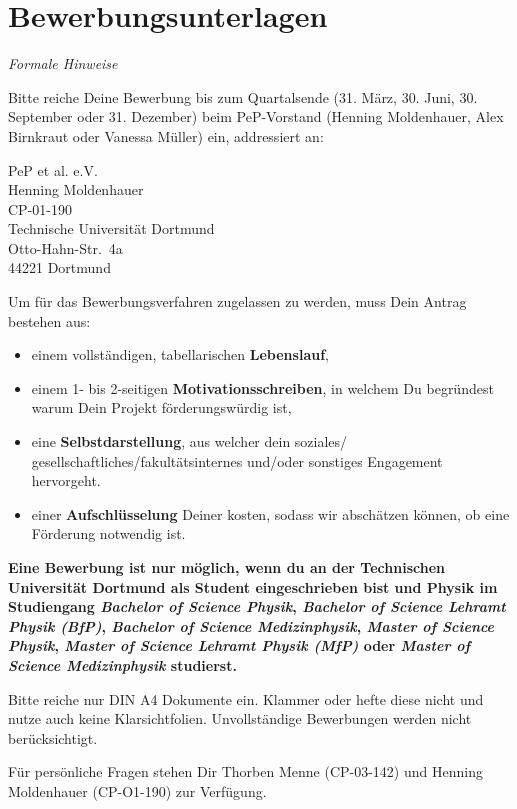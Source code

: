 \documentclass[
  paper=a4,
  fontsize=12pt,
  DIV=16,
  headheight=52pt,
  footheight=45pt,
  headinclude,
  parskip=full,
]{scrartcl}
\begin{document}
\section*{Bewerbungsunterlagen}
\emph{Formale Hinweise}

Bitte reiche Deine Bewerbung bis zum Quartalsende (31. März, 30. Juni,
30. September oder 31. Dezember) beim PeP-Vorstand
(Henning Moldenhauer, Alex Birnkraut oder Vanessa Müller) ein,
addressiert an:

PeP et al. e.V.\\
Henning Moldenhauer\\
CP-01-190\\[0.5\baselineskip]
Technische Universität Dortmund\\
Otto-Hahn-Str.~4a\\
44221 Dortmund

Um für das Bewerbungsverfahren zugelassen zu werden, muss Dein Antrag bestehen aus:
\begin{itemize}
  \item einem vollständigen, tabellarischen \textbf{Lebenslauf},
  \item einem 1- bis 2-seitigen \textbf{Motivationsschreiben}, in welchem Du
	  begründest warum Dein Projekt förderungswürdig ist,
  \item eine \textbf{Selbstdarstellung}, aus welcher dein soziales/
	  gesellschaftliches/fakultätsinternes und/oder sonstiges Engagement hervorgeht.
  \item einer \textbf{Aufschlüsselung} Deiner kosten, sodass wir abschätzen können,
	  ob eine Förderung notwendig ist.
\end{itemize}

\textbf{%
  Eine Bewerbung ist nur möglich, wenn du an der Technischen Universität Dortmund
  als Student eingeschrieben bist und Physik im Studiengang
  \emph{Bachelor of Science Physik},
  \emph{Bachelor of Science Lehramt Physik (BfP)},
  \emph{Bachelor of Science Medizinphysik},
  \emph{Master of Science Physik},
  \emph{Master of Science Lehramt Physik (MfP)} oder
  \emph{Master of Science Medizinphysik} studierst.
}

Bitte reiche nur DIN A4 Dokumente ein. Klammer oder hefte diese nicht und nutze auch
keine Klarsichtfolien. Unvollständige Bewerbungen werden nicht berücksichtigt.

Für persönliche Fragen stehen Dir Thorben Menne (CP-03-142) und
Henning Moldenhauer (CP-O1-190) zur Verfügung.
\end{document}
